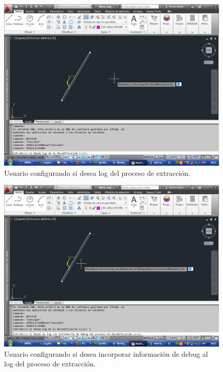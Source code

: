 \begin{figure}[h]
\begin{center}
\includegraphics[width=\textwidth]{imgs/autocad6}
\caption{Usuario configurando si desea log del proceso de extracción.}
\end{center}
\end{figure}

\begin{figure}[h]
\begin{center}
\includegraphics[width=\textwidth]{imgs/autocad7}
\caption{Usuario configurando si desea incorporar información de debug al log del proceso de extracción.}
\end{center}
\end{figure}

